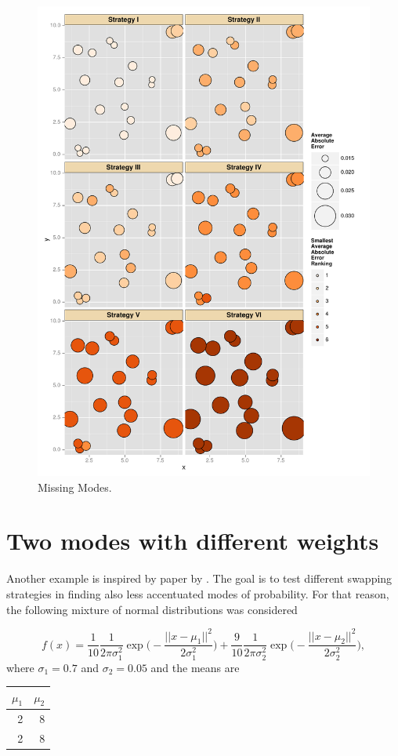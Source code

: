 \documentclass{book}
\begin{document}
\begin{figure}[ht]
	\centering \includegraphics[width=\textwidth,keepaspectratio=TRUE]{./img/ggplotAverageAbsoluteError.pdf}
	\caption{Missing Modes.}\label{missingModes}
\end{figure}

\section{Two modes with different weights}

Another example is inspired by paper by \cite{BaragattiLikelihoodFreeParallelTempering}. The goal is to test different swapping strategies in finding also less accentuated modes of probability. For that reason, the following mixture of normal distributions was considered

\begin{equation*}
f(x) = 
 	\frac{1}{10} \frac{1}{2 \pi \sigma_1^2} \exp \Big( -\frac{ ||x - \mu_1||^2}{2 \sigma_1^2} \Big) +
 	\frac{9}{10} \frac{1}{2 \pi \sigma_2^2} \exp \Big( -\frac{ ||x - \mu_2||^2}{2 \sigma_2^2} \Big)
 	,	
\end{equation*}
where $\sigma_1 = 0.7$ and $\sigma_2 = 0.05$ and the means are 

\begin{table}[ht]
	\centering
	\begin{tabular}{rr}
	  	\hline
			$\mu_1$ & $\mu_2$ \\ 
	  	\hline
			2 & 8 \\ 
			2 & 8 \\ 
	   	\hline
	\end{tabular}
\end{table}



	
	
\end{document}
